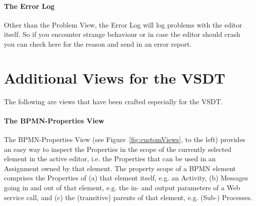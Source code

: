 \paragraph*{The Error Log}
Other than the Problem View, the Error Log will log problems with the editor
itself.  So if you encounter strange behaviour or in case the editor should crash
you can check here for the reason and send in an error report.



\section{Additional Views for the VSDT}
\label{sec:user_perspective_custom}

The following are views that have been crafted especially for the VSDT.

\paragraph*{The BPMN-Properties View}
\label{sec:user_perspective_propView}

The BPMN-Properties View (see Figure~\ref{fig:customViews}, to the left) provides
an easy way to inspect the Properties in the scope of the currently selected
element in the active editor, i.e. the Properties that can be used in an Assignment
owned by that element.  The property scope of a BPMN element comprises the
Properties of (a) that element itself, e.g. an Activity, (b) Messages going in
and out of that element, e.g. the in- and output parameters of a Web service call,
and (c) the (transitive) parents of that element, e.g. (Sub-) Processes.

